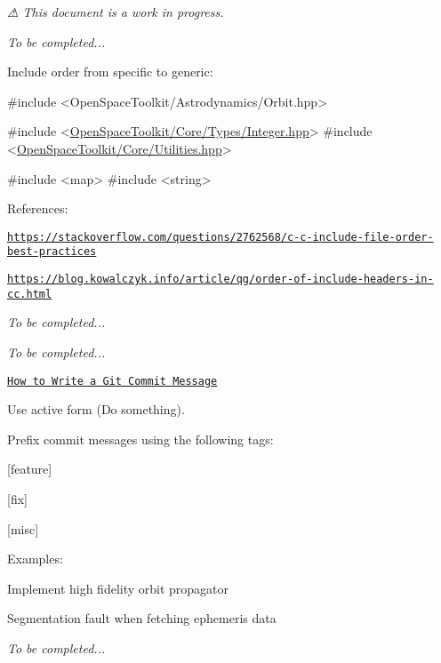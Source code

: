 {\itshape ⚠ This document is a work in progress.}

{\itshape To be completed...}

Include order from specific to generic\+:


\begin{DoxyCode}
\textcolor{preprocessor}{#include <OpenSpaceToolkit/Astrodynamics/Orbit.hpp>}

\textcolor{preprocessor}{#include <\hyperlink{_integer_8hpp}{OpenSpaceToolkit/Core/Types/Integer.hpp}>}
\textcolor{preprocessor}{#include <\hyperlink{_utilities_8hpp}{OpenSpaceToolkit/Core/Utilities.hpp}>}

\textcolor{preprocessor}{#include <map>}
\textcolor{preprocessor}{#include <string>}
\end{DoxyCode}


References\+:


\begin{DoxyItemize}
\item \href{https://stackoverflow.com/questions/2762568/c-c-include-file-order-best-practices}{\tt https\+://stackoverflow.\+com/questions/2762568/c-\/c-\/include-\/file-\/order-\/best-\/practices}
\item \href{https://blog.kowalczyk.info/article/qg/order-of-include-headers-in-cc.html}{\tt https\+://blog.\+kowalczyk.\+info/article/qg/order-\/of-\/include-\/headers-\/in-\/cc.\+html}
\end{DoxyItemize}

{\itshape To be completed...}

{\itshape To be completed...}

\href{https://chris.beams.io/posts/git-commit/}{\tt How to Write a Git Commit Message}

Use active form ({\ttfamily Do something}).

Prefix commit messages using the following tags\+:


\begin{DoxyItemize}
\item \mbox{[}feature\mbox{]}
\item \mbox{[}fix\mbox{]}
\item \mbox{[}misc\mbox{]}
\end{DoxyItemize}

Examples\+:


\begin{DoxyCode}
[feature] Implement high fidelity orbit propagator
\end{DoxyCode}



\begin{DoxyCode}
[fix] Segmentation fault when fetching ephemeris data
\end{DoxyCode}


{\itshape To be completed...} 